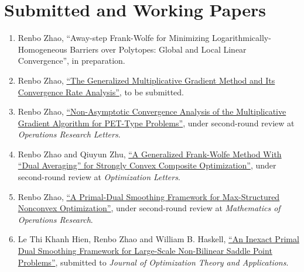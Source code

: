 \documentclass[11pt]{article}
\newcommand{\MOR}{Mathematics of Operations Research}
\newcommand{\JOTA}{Journal of Optimization Theory and Applications}
\newcommand{\ORL}{Operations Research Letters}
\newcommand{\OPTL}{Optimization Letters}
\begin{document}


\section*{\large Submitted and Working Papers}

\begin{enumerate}[label=W\arabic*.]\setlength{\leftskip}{2ex}
\item Renbo Zhao, ``Away-step Frank-Wolfe for Minimizing Logarithmically-Homogeneous Barriers over Polytopes: Global and Local Linear Convergence'', in preparation. 
\item Renbo Zhao, \href{https://arxiv.org/abs/2207.13198}{``The Generalized Multiplicative Gradient Method and Its Convergence Rate Analysis''}, to be submitted.
\item Renbo Zhao, \href{https://arxiv.org/abs/2109.05601}{``Non-Asymptotic Convergence Analysis of the Multiplicative Gradient Algorithm for PET-Type Problems''}, under second-round review at {\em \ORL}.
\item Renbo Zhao and Qiuyun Zhu, \href{https://arxiv.org/abs/2106.15786}{``A Generalized Frank-Wolfe Method With “Dual Averaging” for Strongly Convex Composite Optimization''}, under second-round review at {\em \OPTL}.
\item Renbo Zhao, \href{https://arxiv.org/abs/2003.04375}{``A Primal-Dual Smoothing Framework for Max-Structured Nonconvex Optimization''}, under second-round review at {\em \MOR}. 
\item Le Thi Khanh Hien, {Renbo Zhao} and William B. Haskell, \href{https://arxiv.org/abs/1711.03669}{``An Inexact Primal Dual Smoothing Framework for Large-Scale Non-Bilinear Saddle Point Problems''}, submitted to {\em \JOTA}.
\end{enumerate}


\end{document}
